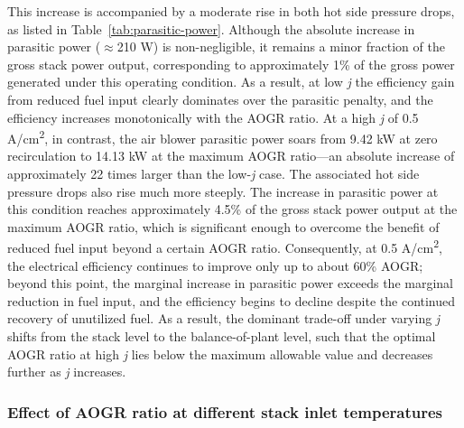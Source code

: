 \documentclass[a4paper,10pt]{cas-dc} %
\begin{document}
This increase is accompanied by a moderate rise in both hot side pressure drops, as listed in Table~\ref{tab:parasitic-power}.
Although the absolute increase in parasitic power ($\approx$210 W) is non-negligible, it remains a minor fraction of the gross stack power output, corresponding to approximately 1\% of the gross power generated under this operating condition.
As a result, at low \emph{j} the efficiency gain from reduced fuel input clearly dominates over the parasitic penalty, and the efficiency increases monotonically with the AOGR ratio.
At a high \emph{j} of 0.5 A/cm\textsuperscript{2}, in contrast, the air blower parasitic power soars from 9.42 kW at zero recirculation to 14.13 kW at the maximum AOGR ratio---an absolute increase of approximately 22 times larger than the low-\emph{j} case.
The associated hot side pressure drops also rise much more steeply.
The increase in parasitic power at this condition reaches approximately 4.5\% of the gross stack power output at the maximum AOGR ratio, which is significant enough to overcome the benefit of reduced fuel input beyond a certain AOGR ratio.
Consequently, at 0.5 A/cm\textsuperscript{2}, the electrical efficiency continues to improve only up to about 60\% AOGR; beyond this point, the marginal increase in parasitic power exceeds the marginal reduction in fuel input, and the efficiency begins to decline despite the continued recovery of unutilized fuel.
As a result, the dominant trade-off under varying \emph{j} shifts from the stack level to the balance-of-plant level, such that the optimal AOGR ratio at high \emph{j} lies below the maximum allowable value and decreases further as \emph{j} increases.

\subsubsection{Effect of AOGR ratio at different stack inlet temperatures}
\end{document}
